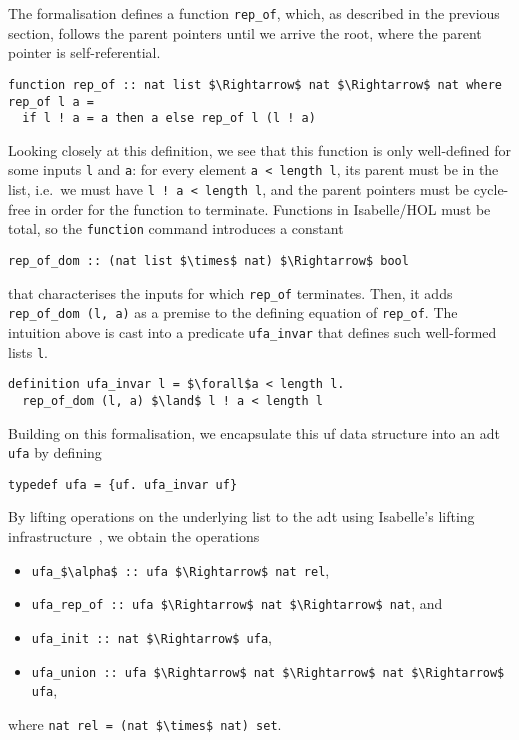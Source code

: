 \documentclass[
  sigplan,
  10pt,
  anonymous,
  review,
  ]{acmart}
\begin{document}
The formalisation defines a function \lstinline|rep_of|, which, as described in the previous section, follows the parent pointers until we arrive the root, where the parent pointer is self-referential.
\begin{lstlisting}[columns=fullflexible]
function rep_of :: nat list $\Rightarrow$ nat $\Rightarrow$ nat where
rep_of l a =
  if l ! a = a then a else rep_of l (l ! a)
\end{lstlisting}
Looking closely at this definition, we see that this function is only well-defined for some inputs \lstinline|l| and \lstinline|a|:
for every element \lstinline|a < length l|, its parent must be in the list, i.e.\ we must have \lstinline|l ! a < length l|, and the parent pointers must be cycle-free in order for the function to terminate.
Functions in Isabelle/HOL must be total, so the \lstinline|function| command introduces a constant
\begin{lstlisting}
rep_of_dom :: (nat list $\times$ nat) $\Rightarrow$ bool  
\end{lstlisting}
that characterises the inputs for which \lstinline|rep_of| terminates.
Then, it adds \lstinline|rep_of_dom (l, a)| as a premise to the defining equation of \lstinline|rep_of|. 
The intuition above is cast into a predicate \lstinline|ufa_invar| that defines such well-formed lists \lstinline|l|.
\begin{lstlisting}
definition ufa_invar l = $\forall$a < length l.
  rep_of_dom (l, a) $\land$ l ! a < length l
\end{lstlisting}
Building on this formalisation, we encapsulate this \acrshort{uf} data structure into an \acrfull{adt} \lstinline|ufa| by defining
\begin{lstlisting}
typedef ufa = {uf. ufa_invar uf}
\end{lstlisting}
By lifting operations on the underlying list to the \acrshort{adt} using Isabelle's lifting infrastructure~\cite{lifting_transfer}, we obtain the operations
\begin{itemize}
  \item \lstinline!ufa_$\alpha$ :: ufa $\Rightarrow$ nat rel!,
  \item \lstinline!ufa_rep_of :: ufa $\Rightarrow$ nat $\Rightarrow$ nat!, and
  \item \lstinline|ufa_init :: nat $\Rightarrow$ ufa|,
  \item \lstinline!ufa_union :: ufa $\Rightarrow$ nat $\Rightarrow$ nat $\Rightarrow$ ufa!,
\end{itemize}
where \lstinline!nat rel = (nat $\times$ nat) set!.
\end{document}

